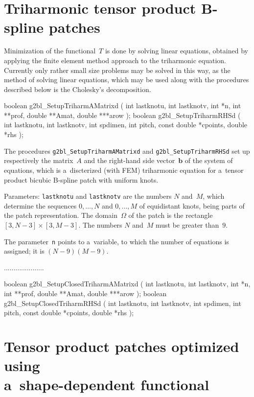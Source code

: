 \section{\label{sect:g2bl:triharmonic}Triharmonic tensor product B-spline patches}

Minimization of the functional~$T$ is done by solving linear equations,
obtained by applying the finite element method approach to the triharmonic
equation. Currently only rather small size problems may be solved in this
way, as the method of solving linear equations, which may be used along with
the procedures described below is the Cholesky's decomposition.

\begin{listingC}
boolean g2bl_SetupTriharmAMatrixd ( int lastknotu, int lastknotv,
                 int *n, int **prof, double **Amat, double ***arow );
boolean g2bl_SetupTriharmRHSd ( int lastknotu, int lastknotv,
                 int spdimen, int pitch, const double *cpoints,
                 double *rhs );
\end{listingC}
The procedures \texttt{g2bl\_SetupTriharmAMatrixd} and
\texttt{g2bl\_SetupTriharmRHSd} set up respectively the matrix~$A$ and the
right-hand side vector~$\bm{b}$ of the system of equations, which is
a~discterized (with FEM) triharmonic equation for a~tensor product bicubic
B-spline patch with uniform knots.

Parameters: \texttt{lastknotu} and \texttt{lastknotv} are the numbers $N$
and~$M$, which determine the sequences $0,\ldots,N$ and $0,\ldots,M$ of
equidistant knots, being parts of the patch representation. The
domain~$\varOmega$ of the patch is the rectangle $[3,N-3]\times[3,M-3]$.
The numbers $N$ and~$M$ must be greater than~$9$.

The parameter~\texttt{n} points to a~variable, to which the number of
equations is assigned; it is $(N-9)(M-9)$.

.....................


\begin{listingC}
boolean g2bl_SetupClosedTriharmAMatrixd (
                 int lastknotu, int lastknotv,
                 int *n, int **prof, double **Amat, double ***arow );
boolean g2bl_SetupClosedTriharmRHSd ( int lastknotu, int lastknotv,
                 int spdimen, int pitch, const double *cpoints,
                 double *rhs );
\end{listingC}


\newpage
\section{\label{sect:g2bl:tensor:nl}Tensor product patches optimized using \\
a~shape-dependent functional}


